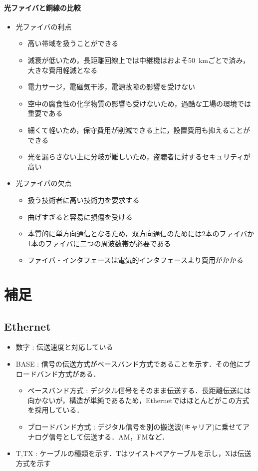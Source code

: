 \documentclass[a4paper]{ltjsarticle}
\begin{document}
			\paragraph{光ファイバと銅線の比較}
				\begin{itemize}
					\item 光ファイバの利点
					\begin{itemize}
						\item 高い帯域を扱うことができる
						\item 減衰が低いため，長距離回線上では中継機はおよそ\SI{50}{km}ごとで済み，大きな費用軽減となる
						\item 電力サージ，電磁気干渉，電源故障の影響を受けない
						\item 空中の腐食性の化学物質の影響も受けないため，過酷な工場の環境では重要である
						\item 細くて軽いため，保守費用が削減できる上に，設置費用も抑えることができる
						\item 光を漏らさない上に分岐が難しいため，盗聴者に対するセキュリティが高い
					\end{itemize}
					\item 光ファイバの欠点
					\begin{itemize}
						\item 扱う技術者に高い技術力を要求する
						\item 曲げすぎると容易に損傷を受ける
						\item 本質的に単方向通信となるため，双方向通信のためには2本のファイバか1本のファイバに二つの周波数帯が必要である
						\item ファイバ・インタフェースは電気的インタフェースより費用がかかる
					\end{itemize}
				\end{itemize}

\section{補足}
	\subsection{Ethernet}
		\begin{itemize}
			\item 数字 : 伝送速度と対応している
			\item BASE : 信号の伝送方式がベースバンド方式であることを示す．その他にブロードバンド方式がある．
			\begin{itemize}
				\item ベースバンド方式 : デジタル信号をそのまま伝送する．長距離伝送には向かないが，構造が単純であるため，Ethernetではほとんどがこの方式を採用している．
				\item ブロードバンド方式 : デジタル信号を別の搬送波(キャリア)に乗せてアナログ信号として伝送する．AM，FMなど．
			\end{itemize}
			\item T,TX : ケーブルの種類を示す．Tはツイストペアケーブルを示し，Xは伝送方式を示す
		\end{itemize}
\end{document}
